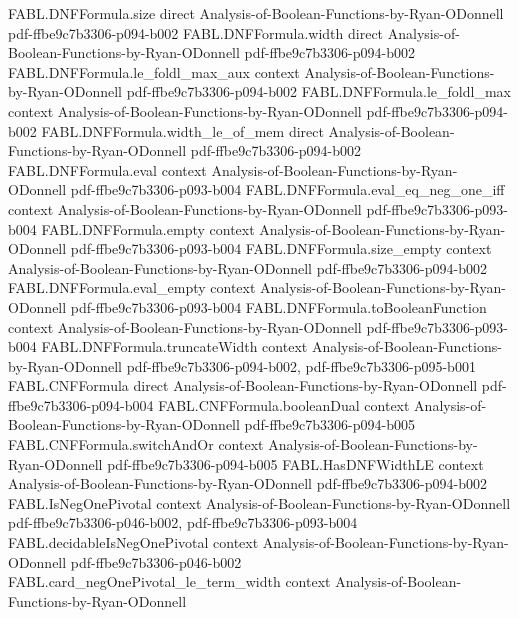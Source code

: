 \begin{theorem}
\proofstep
  {FABL.DNFFormula.size}
  {direct}
  {Analysis-of-Boolean-Functions-by-Ryan-ODonnell}
  {pdf-ffbe9c7b3306-p094-b002}
\proofstep
  {FABL.DNFFormula.width}
  {direct}
  {Analysis-of-Boolean-Functions-by-Ryan-ODonnell}
  {pdf-ffbe9c7b3306-p094-b002}
\proofstep
  {FABL.DNFFormula.le_foldl_max_aux}
  {context}
  {Analysis-of-Boolean-Functions-by-Ryan-ODonnell}
  {pdf-ffbe9c7b3306-p094-b002}
\proofstep
  {FABL.DNFFormula.le_foldl_max}
  {context}
  {Analysis-of-Boolean-Functions-by-Ryan-ODonnell}
  {pdf-ffbe9c7b3306-p094-b002}
\proofstep
  {FABL.DNFFormula.width_le_of_mem}
  {direct}
  {Analysis-of-Boolean-Functions-by-Ryan-ODonnell}
  {pdf-ffbe9c7b3306-p094-b002}
\proofstep
  {FABL.DNFFormula.eval}
  {context}
  {Analysis-of-Boolean-Functions-by-Ryan-ODonnell}
  {pdf-ffbe9c7b3306-p093-b004}
\proofstep
  {FABL.DNFFormula.eval_eq_neg_one_iff}
  {context}
  {Analysis-of-Boolean-Functions-by-Ryan-ODonnell}
  {pdf-ffbe9c7b3306-p093-b004}
\proofstep
  {FABL.DNFFormula.empty}
  {context}
  {Analysis-of-Boolean-Functions-by-Ryan-ODonnell}
  {pdf-ffbe9c7b3306-p093-b004}
\proofstep
  {FABL.DNFFormula.size_empty}
  {context}
  {Analysis-of-Boolean-Functions-by-Ryan-ODonnell}
  {pdf-ffbe9c7b3306-p094-b002}
\proofstep
  {FABL.DNFFormula.eval_empty}
  {context}
  {Analysis-of-Boolean-Functions-by-Ryan-ODonnell}
  {pdf-ffbe9c7b3306-p093-b004}
\proofstep
  {FABL.DNFFormula.toBooleanFunction}
  {context}
  {Analysis-of-Boolean-Functions-by-Ryan-ODonnell}
  {pdf-ffbe9c7b3306-p093-b004}
\proofstep
  {FABL.DNFFormula.truncateWidth}
  {context}
  {Analysis-of-Boolean-Functions-by-Ryan-ODonnell}
  {pdf-ffbe9c7b3306-p094-b002,
    pdf-ffbe9c7b3306-p095-b001}
\proofstep
  {FABL.CNFFormula}
  {direct}
  {Analysis-of-Boolean-Functions-by-Ryan-ODonnell}
  {pdf-ffbe9c7b3306-p094-b004}
\proofstep
  {FABL.CNFFormula.booleanDual}
  {context}
  {Analysis-of-Boolean-Functions-by-Ryan-ODonnell}
  {pdf-ffbe9c7b3306-p094-b005}
\proofstep
  {FABL.CNFFormula.switchAndOr}
  {context}
  {Analysis-of-Boolean-Functions-by-Ryan-ODonnell}
  {pdf-ffbe9c7b3306-p094-b005}
\proofstep
  {FABL.HasDNFWidthLE}
  {context}
  {Analysis-of-Boolean-Functions-by-Ryan-ODonnell}
  {pdf-ffbe9c7b3306-p094-b002}
\proofstep
  {FABL.IsNegOnePivotal}
  {context}
  {Analysis-of-Boolean-Functions-by-Ryan-ODonnell}
  {pdf-ffbe9c7b3306-p046-b002,
    pdf-ffbe9c7b3306-p093-b004}
\proofstep
  {FABL.decidableIsNegOnePivotal}
  {context}
  {Analysis-of-Boolean-Functions-by-Ryan-ODonnell}
  {pdf-ffbe9c7b3306-p046-b002}
\proofstep
  {FABL.card_negOnePivotal_le_term_width}
  {context}
  {Analysis-of-Boolean-Functions-by-Ryan-ODonnell}

\end{theorem}
